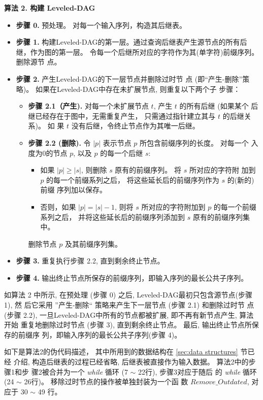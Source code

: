 \textbf{算法 2. 构建 Leveled-DAG}
\begin{itemize}
\item \textbf{步骤 0.} 预处理。 对每一个输入序列，构造其后继表。
\item \textbf{步骤 1.} 构建Leveled-DAG的第一层。通过查询后继表产生源节点的所有后
  继，作为图的第一层。 令每一个后继所对应的字符作为其(单字符)前缀序列。删除源节
  点。
\item \textbf{步骤 2.} 产生Leveled-DAG的下一层节点并删除过时节
  点 (即“产生-删除”策略)。 如果在Leveled-DAG中存在未扩展节点, 则重复以下两个子
  步骤：
  \begin{itemize}
  \item \textbf{步骤 2.1（产生).} 对每一个未扩展节点 $t$, 产生 $t$ 的所有后继 (如果某个
    后继已经存在于图中，无需重复产生， 只需通过指针建立其与 $t$ 的后继关系)。 如
    果 $t$ 没有后继，令终止节点作为其唯一后继。
  \item \textbf{步骤 2.2 (删除).} 令 $|p|$ 表示节点 $p$ 所包含前缀序列的长度。 对每一个
    入度为0的节点 $p$, 以及 $p$ 的每一个后继 $s$:
    \begin{itemize}
    \item 如果 $|p| \geq |s|$, 则删除 $s$ 原有的前缀序列。 将 $s$ 所对应的字符附
      加到 $p$ 的每一个前缀系列之后， 将这些延长后的前缀序列作为 $s$ 的(新的)前缀
      序列加以保存。
    \item 否则，如果 $|p| = |s|-1$, 则将 $s$ 所对应的字符附加到 $p$ 的每一个前缀
      系列之后， 并将这些延长后的前缀序列添加到 $s$ 原有的前缀序列集中。
    \end{itemize}
    删除节点 $p$ 及其前缀序列集。
  \end{itemize}
\item \textbf{步骤 3.} 重复执行步骤 2.2, 直到剩余终止节点。
\item \textbf{步骤 4.} 输出终止节点所保存的前缀序列，即输入序列的最长公共子序列。
\end{itemize}

如算法 2 中所示, 在预处理 (步骤 0) 之后, Leveled-DAG最初只包含源节点(步骤 1), 然
后它采用 ”产生-删除“ 策略来产生下一层节点 (步骤 2.1) 和删除过时节
点 (步骤 2.2), 一旦Leveled-DAG中所有的节点都被扩展, 即不再有新节点产生, 算法开始
重复地删除过时节点 (步骤 3), 直到剩余终止节点。 最后, 输出终止节点所保存的前缀序
列，即输入序列的最长公共子序列(步骤 4)。

如下是算法2的伪代码描述， 其中所用到的数据结构在 \ref{sec:data structures} 节已经
介绍, 构造后继表的过程已经省略, 后继表被直接作为输入数据。 算法2中的步骤1和步
骤2被合并为一个 \emph{while} 循环 (7 $\sim$ 22行), 步骤3对应于随后
的 \emph{while} 循环 (24 $\sim$ 26行)。 移除过时节点的操作被单独封装为一个函
数 $Remove\_Outdated$, 对应于 30 $\sim$ 49 行。

